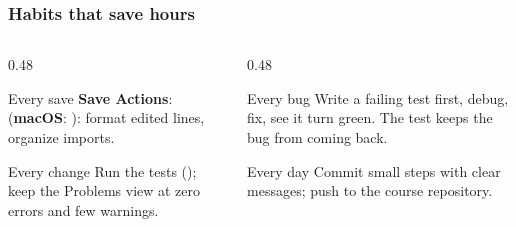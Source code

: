\documentclass[aspectratio=169,10pt,compress]{beamer}
\newcommand{\mac}{\textbf{macOS}}
\begin{document}




\begin{frame}[t,fragile] \frametitle{Habits that save hours}
  \begin{columns}[T]
    \begin{column}{0.48\textwidth}
      \begin{block}{Every save}
        \small \textbf{Save Actions}:  (\mac: ):
        format edited lines, organize imports.
      \end{block}
      \begin{block}{Every change}
        \small Run the tests (); keep the Problems view at zero errors and few warnings.
      \end{block}
    \end{column}
    \begin{column}{0.48\textwidth}
      \begin{block}{Every bug}
        \small Write a failing test first, debug, fix, see it turn green. The test keeps the bug from coming back.
      \end{block}
      \begin{block}{Every day}
        \small Commit small steps with clear messages; push to the course repository.
      \end{block}
    \end{column}
  \end{columns}
\end{frame}

\end{document}
